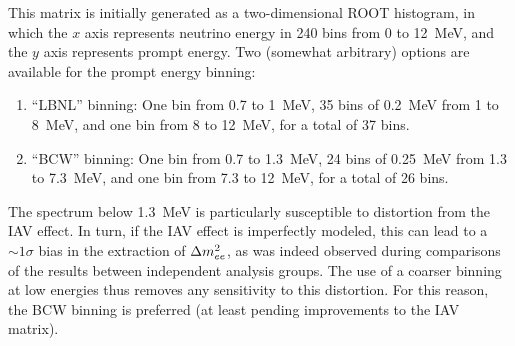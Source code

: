 \documentclass[../thesis.tex]{subfiles}
\begin{document}
This matrix is initially generated as a two-dimensional ROOT histogram, in which the $x$ axis represents neutrino energy in 240 bins from 0 to 12~MeV, and the $y$ axis represents prompt energy. Two (somewhat arbitrary) options are available for the prompt energy binning:

\begin{enumerate}
\item ``LBNL'' binning: One bin from 0.7 to 1~MeV, 35 bins of 0.2~MeV from 1 to 8~MeV, and one bin from 8 to 12~MeV, for a total of 37 bins.
\item ``BCW'' binning: One bin from 0.7 to 1.3~MeV, 24 bins of 0.25~MeV from 1.3 to 7.3~MeV, and one bin from 7.3 to 12~MeV, for a total of 26 bins.
\end{enumerate}

The spectrum below 1.3~MeV is particularly susceptible to distortion from the IAV effect. In turn, if the IAV effect is imperfectly modeled, this can lead to a $\sim1\sigma$ bias in the extraction of $\Delta m^2_{ee}$, as was indeed observed during comparisons of the results between independent analysis groups. The use of a coarser binning at low energies thus removes any sensitivity to this distortion. For this reason, the BCW binning is preferred (at least pending improvements to the IAV matrix).

\begin{comment}
  I don't see any reason to mention the fact that a finer binning (2880 instead of 240) is used internally by the toy MC when generating this matrix. With the standard 240 bins, the edges line up with both the LBNL and BCW edges, so there shouldn't be any benefit from using a finer binning.

  deleted: Internally, the toy MC normally represents both neutrino and prompt energy using 240 bins (of 50~keV) from 0 to 12~MeV.
\end{comment}
\end{document}

